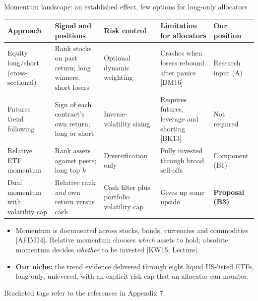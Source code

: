 \documentclass[aspectratio=169,11pt]{beamer}
\newcommand{\src}[1]{\par\vfill{\scriptsize\color{muted}\sloppy #1\par}\vskip0.05cm}
\newcommand{\rcite}[1]{{\color{muted}[#1]}}
\begin{document}
\begin{frame}[t]{Momentum landscape: an established effect, few options for long-only allocators}
\footnotesize
\begin{tabularx}{\textwidth}{@{}>{\raggedright\arraybackslash}p{2.35cm}>{\raggedright\arraybackslash}X>{\raggedright\arraybackslash}X>{\raggedright\arraybackslash}X>{\raggedright\arraybackslash}p{2.6cm}@{}}
\toprule
Approach & Signal and positions & Risk control & Limitation for allocators & Our position \\
\midrule
Equity long/short (cross-sectional) & Rank stocks on past return; long winners, short losers & Optional dynamic weighting & Crashes when losers rebound after panics \rcite{DM16} & Research input (A) \\
Futures trend following & Sign of each contract's own return; long or short & Inverse-volatility sizing & Requires futures, leverage and shorting \rcite{BK13} & Not required \\
Relative ETF momentum & Rank assets against peers; long top $k$ & Diversification only & Fully invested through broad sell-offs & Component (B1) \\
\rowcolor{accentlight} Dual momentum with volatility cap & Relative rank \emph{and} own return versus cash & Cash filter plus portfolio volatility cap & Gives up some upside & \textbf{Proposal (B3)} \\
\bottomrule
\end{tabularx}

\vskip0.35cm
\small
\begin{itemize}\itemsep3pt
\item Momentum is documented across stocks, bonds, currencies and commodities \rcite{AFIM14}. Relative momentum chooses \emph{which} assets to hold; absolute momentum decides \emph{whether} to be invested \rcite{KW15; Lecture}.
\item \textbf{Our niche:} the trend evidence delivered through eight liquid US-listed ETFs, long-only, unlevered, with an explicit risk cap that an allocator can monitor.
\end{itemize}
\src{Bracketed tags refer to the references in Appendix 7.}
\end{frame}
\end{document}
